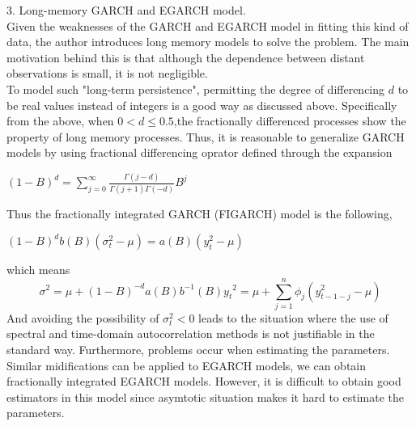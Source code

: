 \documentclass[10pt,a4paper]{article}
\begin{document}
3. Long-memory GARCH and EGARCH model.\\

Given the weaknesses of the GARCH and EGARCH model in fitting this kind of data, the author introduces long memory models to solve the problem. The main motivation behind this is that although the dependence between distant observations is small, it is not negligible.\\
  To model such "long-term persistence", permitting the degree of differencing $d$ to be real values instead of integers is a good way as discussed above. Specifically from the above, when $0<d\leq 0.5$,the fractionally differenced processes show the property of long memory processes. Thus, it is reasonable to generalize GARCH models by using fractional differencing oprator defined through the expansion

\begin{center}$\displaystyle (1-B)^d=\sum_{j=0}^{\infty}\frac{\Gamma(j-d)}{\Gamma(j+1)\Gamma(-d)}B^j $\end{center}

Thus the fractionally integrated GARCH (FIGARCH) model is the following,

\begin{center}$\displaystyle (1-B)^db(B)(\sigma^2_t-\mu)=a(B)(y^2_t-\mu) $\end{center}
which means
$$\sigma^2=\mu+(1-B)^{-d}a(B)b^{-1}(B){y_t}^2=\mu+\sum_{j=1}^{n}\phi_j(y_{t-1-j}^2-\mu)$$
And avoiding the possibility of $\sigma_t^2<0$ leads to the situation where the use of spectral and time-domain autocorrelation methods is not justifiable in the standard way. Furthermore, problems occur when estimating the parameters.\\
Similar midifications can be applied to EGARCH models, we can obtain fractionally integrated EGARCH models. However, it is difficult to obtain good estimators in this model since asymtotic situation makes it hard to estimate the parameters.\cite{shumway2000time}
\end{document}
